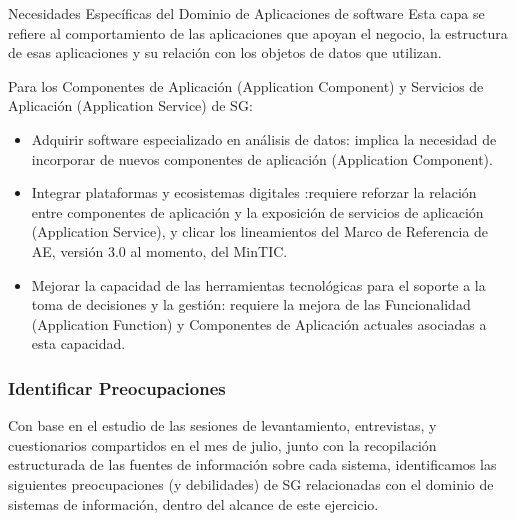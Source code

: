 \documentclass[
	a4paper, %
	12pt, %
]{include/CSSullivanBusinessReport}
\def\tightlist{}
\begin{document}
Necesidades Específicas del Dominio de Aplicaciones de software Esta
capa se refiere al comportamiento de las aplicaciones que apoyan el
negocio, la estructura de esas aplicaciones y su relación con los
objetos de datos que utilizan.

Para los Componentes de Aplicación (Application Component) y Servicios
de Aplicación (Application Service) de SG:

\begin{itemize}
\tightlist
\item
  Adquirir software especializado en análisis de datos: implica la
  necesidad de incorporar de nuevos componentes de aplicación
  (Application Component).
\item
  Integrar plataformas y ecosistemas digitales :requiere reforzar la
  relación entre componentes de aplicación y la exposición de servicios
  de aplicación (Application Service), y clicar los lineamientos del
  Marco de Referencia de AE, versión 3.0 al momento, del MinTIC.
\item
  Mejorar la capacidad de las herramientas tecnológicas para el soporte
  a la toma de decisiones y la gestión: requiere la mejora de las
  Funcionalidad (Application Function) y Componentes de Aplicación
  actuales asociadas a esta capacidad.
\end{itemize}

\subsubsection{Identificar
Preocupaciones}\label{sec:identificar-preocupaciones}

Con base en el estudio de las sesiones de levantamiento, entrevistas, y
cuestionarios compartidos en el mes de julio, junto con la recopilación
estructurada de las fuentes de información sobre cada sistema,
identificamos las siguientes preocupaciones (y debilidades) de SG
relacionadas con el dominio de sistemas de información, dentro del
alcance de este ejercicio.
\end{document}
